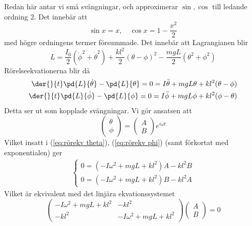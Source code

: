 Redan här antar vi små svängningar, och approximerar $\sin,\cos$ till ledande ordning 2. Det innebär att \begin{equation}
    \sin x = x,\quad \cos x = 1-\frac{x^2}{2}
\end{equation}
med högre ordningens termer försummade. Det innebär att Lagrangianen blir \begin{equation}
    L = \frac{I_0}{2}(\dot{\phi}^2+\dot{\theta}^2)+ \frac{kl^2}{2}(\theta-\phi)^2-\frac{mgL}{2}(\theta^2+\phi^2)
\end{equation}
Rörelseekvationerna blir då \begin{align}
    \der{}{t}\pd{L}{\dot{\theta}}-\pd{L}{\theta} = 0 = I\ddot{\theta}+mgL\theta+kl^2(\theta-\phi) \label{eq:rörekv theta}\\
    \der{}{t}\pd{L}{\dot{\phi}}-\pd{L}{\phi} = 0 = I\ddot{\phi}+mgL\phi+kl^2(\phi-\theta) \label{eq:rörekv phi}
\end{align}
Detta ser ut som kopplade svängningar. Vi gör ansatsen att \begin{equation}
    \begin{pmatrix}
        \theta\\\phi
    \end{pmatrix} = \begin{pmatrix}
        A\\B
    \end{pmatrix}e^{i\omega t}
\end{equation}
Vilket insatt i (\ref{eq:rörekv theta}), (\ref{eq:rörekv phi}) (samt förkortat med exponentialen) ger \begin{align}
    \begin{cases}
        0 = (-I\omega^2+mgL+kl^2)A-{kl^2}B \\
        0 = (-I\omega^2+mgL+kl^2)B-{kl^2}A
    \end{cases}
    \label{eq:rörelse efter ansats}
\end{align}
Vilket är ekvivalent med det linjära ekvationssystemet \begin{equation}
    \begin{pmatrix}
        -I\omega^2+mgL+kl^2 & -kl^2 \\
        -kl^2  &-I\omega^2+mgL+kl^2 
    \end{pmatrix} \begin{pmatrix}
        A\\B
    \end{pmatrix} = 0
\end{equation}
